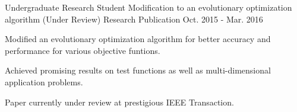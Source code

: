 \begin{cventries}
  \cventry
    {Undergraduate Research Student}
    {Modification to an evolutionary optimization algorithm (Under Review)}
    {Research Publication}
    {Oct. 2015 - Mar. 2016}
    {
      \begin{cvitems}
        \item {Modified an evolutionary optimization algorithm for better accuracy and performance for various objective funtions.}
        \item {Achieved promising results on test functions as well as multi-dimensional application problems.}
        \item {Paper currently under review at prestigious IEEE Transaction.}
      \end{cvitems}
    }
\end{cventries}
